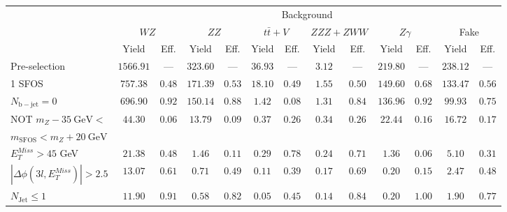 \begin{tabular}{l||c|c||c|c||c|c||c|c||c|c||c|c}
\hline
 &       \multicolumn{12}{c}{Background}\\
 &  \multicolumn{2}{c||}{$WZ$} & \multicolumn{2}{c||}{$ZZ$} & \multicolumn{2}{c||}{$t\bar{t}+V$} & \multicolumn{2}{c||}{$ZZZ+ZWW$} & \multicolumn{2}{c||}{$Z\gamma$} & \multicolumn{2}{c||}{Fake} \\ 
 & Yield & Eff. & Yield & Eff. & Yield & Eff. & Yield & Eff. & Yield & Eff. & Yield & Eff. \\
\hline\hline
Pre-selection & $1566.91$ & --- &  $323.60$ & --- &  $36.93$ & --- &  $3.12$ & --- &  $219.80$ & --- &  $238.12$ & ---  \\
\hline
1 SFOS &  $757.38$ &  $0.48$ &  $171.39$ &  $0.53$ &  $18.10$ &  $0.49$ &  $1.55$ &  $0.50$ &  $149.60$ &  $0.68$ &  $133.47$ &  $0.56$ \\ 
\hline
$N_{\mathrm{b-jet}} = 0$ &  $696.90$ &  $0.92$ &  $150.14$ &  $0.88$ &  $1.42$ &  $0.08$ &  $1.31$ &  $0.84$ &  $136.96$ &  $0.92$ &  $99.93$ &  $0.75$ \\ 
\hline
NOT $m_Z - 35~\mathrm{GeV} <$  &  \multirow{2}{*}{$44.30$} &  \multirow{2}{*}{$0.06$} &  \multirow{2}{*}{$13.79$} &  \multirow{2}{*}{$0.09$} &  \multirow{2}{*}{$0.37$} &  \multirow{2}{*}{$0.26$} &  \multirow{2}{*}{$0.34$} &  \multirow{2}{*}{$0.26$} &  \multirow{2}{*}{$22.44$} &  \multirow{2}{*}{$0.16$} &  \multirow{2}{*}{$16.72$} &  \multirow{2}{*}{$0.17$} \\ 
$ m_{\mathrm{SFOS}} < m_Z + 20~\mathrm{GeV}$ & & & & & & & & & & &  \\
\hline
$E_{T}^{Miss} > 45$ GeV &  $21.38$ &  $0.48$ &  $1.46$ &  $0.11$ &  $0.29$ &  $0.78$ &  $0.24$ &  $0.71$ &  $1.36$ &  $0.06$ &  $5.10$ &  $0.31$ \\ 
\hline
$|\Delta\phi(3l,E_{T}^{Miss})| > 2.5$ &  $13.07$ &  $0.61$ &  $0.71$ &  $0.49$ &  $0.11$ &  $0.39$ &  $0.17$ &  $0.69$ &  $0.20$ &  $0.15$ &  $2.47$ &  $0.48$ \\ 
\hline
$N_{\mathrm{Jet}} \leq 1$ &  $11.90$ &  $0.91$ &  $0.58$ &  $0.82$ &  $0.05$ &  $0.45$ &  $0.14$ &  $0.84$ &  $0.20$ &  $1.00$ &  $1.90$ &  $0.77$\\ 
\hline
\end{tabular}
